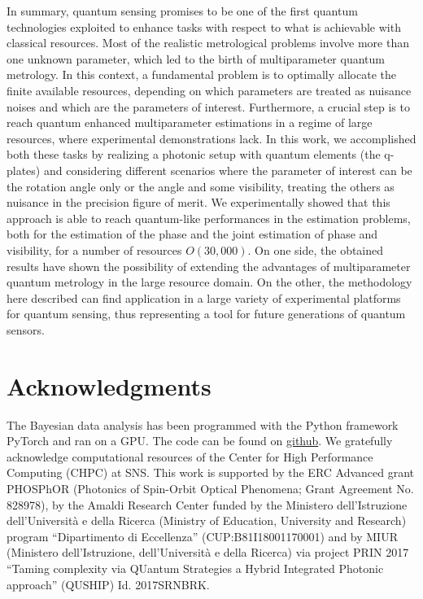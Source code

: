 \documentclass[aps,pra,twocolumn,notitlepage,superscriptaddress]{revtex4-1}
\begin{document}
In summary, quantum sensing promises to be one of the first quantum technologies exploited to enhance tasks with respect to what is achievable with classical resources. Most of the realistic metrological problems involve more than one unknown parameter, which led to the birth of multiparameter quantum metrology. In this context, a fundamental problem is to optimally allocate the finite available resources, depending on which parameters are treated as nuisance noises and which are the parameters of interest. Furthermore, a crucial step is to reach quantum enhanced multiparameter estimations in a regime of large resources, where experimental demonstrations lack. In this work, we accomplished both these tasks by realizing a photonic setup with quantum elements (the q-plates) and considering different scenarios where the parameter of interest can be the rotation angle only or the angle and some visibility, treating the others as nuisance in the precision figure of merit. We experimentally showed that this approach is able to reach quantum-like performances in the estimation problems, both for the estimation of the phase and the joint estimation of phase and visibility, for a number of resources $O(30,000)$. On one side, the obtained results have shown the possibility of extending the advantages of multiparameter quantum metrology in the large resource domain. On the other, the methodology here described can find application in a large variety of experimental platforms for quantum sensing, thus representing a tool for future generations of quantum sensors.
%
\section*{Acknowledgments}
The Bayesian data analysis has been programmed with the Python framework PyTorch and ran on a GPU. The code can be found on \href{https://github.com/fedebell/particle_filter_pytorch}{github}. We gratefully acknowledge computational resources of the Center for High Performance Computing (CHPC) at SNS. This work is supported by the ERC Advanced grant PHOSPhOR (Photonics of Spin-Orbit Optical Phenomena; Grant Agreement No. 828978), by the Amaldi Research Center funded by the Ministero dell'Istruzione dell'Universit\`a e della Ricerca (Ministry of Education, University and Research) program ``Dipartimento di Eccellenza'' (CUP:B81I18001170001) and by MIUR (Ministero dell’Istruzione, dell’Università e della Ricerca) via project PRIN 2017 “Taming complexity via QUantum Strategies a Hybrid Integrated Photonic approach” (QUSHIP) Id. 2017SRNBRK.

\vspace{4cm}

\end{document}

